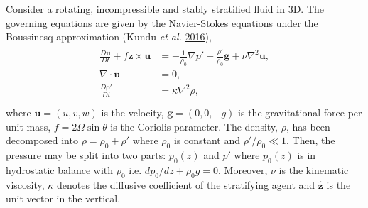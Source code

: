 \documentclass[a4paper]{article}
\numberwithin{equation}{section}
\begin{document}
Consider a rotating, incompressible and stably stratified fluid in 3D. The governing equations are given by the Navier-Stokes equations under the Boussinesq approximation (Kundu \emph{et al.} \hyperlink{ref 3}{2016}), 
\begin{align*}
\begin{split}
\frac{D\mathbf{u}}{Dt} + f\mathbf{\mathbf{\hat{z}}}\times \mathbf{u} &=-\frac{1}{\rho_0} \nabla p' + \frac{\rho'}{\rho_0}\mathbf{g} + \nu \nabla^2 \mathbf{u}, \\
\nabla \cdot \mathbf{u} &= 0, \\
\frac{D\mathbf{\rho'}}{Dt} &= \kappa \nabla^2\rho,\\
\end{split}
\end{align*}
where $\mathbf{u} = (u,v,w)$ is the velocity, $\mathbf{g} = (0, 0, -g)$ is the gravitational force per unit mass, $f = 2\Omega\sin\theta$ is the Coriolis parameter. The density, $\rho$, has been decomposed into $\rho = \rho_0 + \rho'$ where $\rho_0$ is constant and $\rho'/\rho_0 \ll 1$. Then, the pressure may be split into two parts: $p_0(z)$ and $p'$ where $p_0(z)$ is in hydrostatic balance with $\rho_0$ i.e. $dp_0/dz + \rho_0g = 0$. Moreover, $\nu$ is the kinematic viscosity, $\kappa$ denotes the diffusive coefficient of the stratifying agent and $\mathbf{\hat{z}}$ is the unit vector in the vertical.
\end{document}

